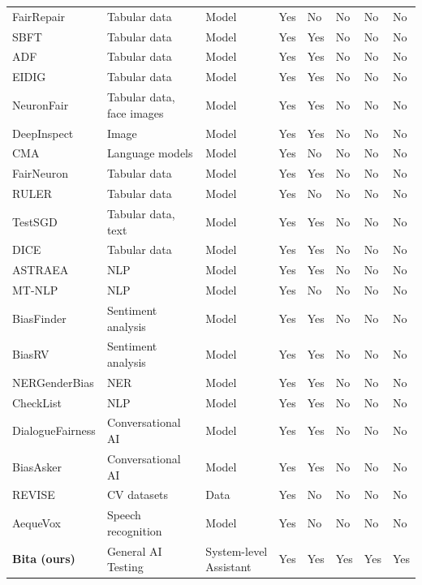 \documentclass[11pt]{article}
\begin{document}
\begin{table}[htbp]
{\begin{tabular}{p{1.8cm} p{2.5cm} p{1.5cm} p{1.5cm} p{1.5cm} p{1.5cm} p{1.5cm} p{1.5cm}}
FairRepair & Tabular data & Model & Yes & No & No & No & No \\
SBFT & Tabular data & Model & Yes & Yes & No & No & No \\
ADF & Tabular data & Model & Yes & Yes & No & No & No \\
EIDIG & Tabular data & Model & Yes & Yes & No & No & No \\
NeuronFair & Tabular data, face images & Model & Yes & Yes & No & No & No \\
DeepInspect & Image & Model & Yes & Yes & No & No & No \\
CMA & Language models & Model & Yes & No & No & No & No \\
FairNeuron & Tabular data & Model & Yes & Yes & No & No & No \\
RULER & Tabular data & Model & Yes & No & No & No & No \\
TestSGD & Tabular data, text & Model & Yes & Yes & No & No & No \\
DICE & Tabular data & Model & Yes & Yes & No & No & No \\
ASTRAEA & NLP & Model & Yes & Yes & No & No & No \\
MT-NLP & NLP & Model & Yes & No & No & No & No \\
BiasFinder & Sentiment analysis & Model & Yes & Yes & No & No & No \\
BiasRV & Sentiment analysis & Model & Yes & Yes & No & No & No \\
NERGenderBias & NER & Model & Yes & Yes & No & No & No \\
CheckList & NLP & Model & Yes & Yes & No & No & No \\
DialogueFairness & Conversational AI & Model & Yes & Yes & No & No & No \\
BiasAsker & Conversational AI & Model & Yes & Yes & No & No & No \\
REVISE & CV datasets & Data & Yes & No & No & No & No \\
AequeVox & Speech recognition & Model & Yes & No & No & No & No \\
\textbf{Bita (ours)} & General AI Testing & System-level Assistant & Yes & Yes & Yes & Yes & Yes \\
\bottomrule
\end{tabular}
}
\end{table}
\end{document}
